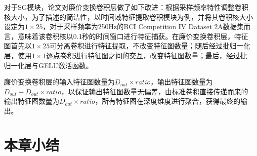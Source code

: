 对于SG模块，论文对廉价变换卷积层做了如下改进：根据采样频率特性调整卷积核大小，为了描述的简洁性，以时间域特征提取卷积模块为例，并将其卷积核大小设定为\(1 \times 25\)，对于采样频率为250Hz的BCI Competition IV Dataset 2A数据集而言，意味着该卷积核以0.1秒的时间窗口进行特征捕获。在廉价变换卷积层，特征图首先以\(1 \times 25\)可分离卷积进行特征提取，不改变特征图数量；随后经过批归一化层，使用\(1 \times 1\)逐点卷积进行特征图之间的交互，改变特征图数量；最后，经过批归一化层与GELU激活函数。

廉价变换卷积层的输入特征图数量为\(D_{out} \times ratio\)，输出特征图数量为\(D_{out}-D_{out} \times ratio\)，以保证输出特征图数量无偏差，由标准卷积直接传递而来的输出特征图数量为\(D_{out} \times ratio\)，所有特征图在深度维度进行聚合，获得最终的输出。

\section{本章小结}
